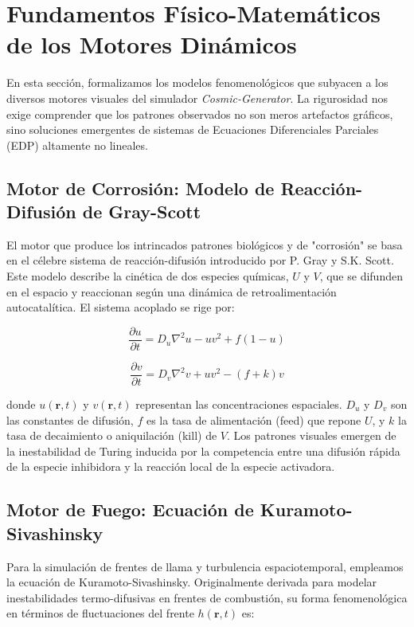 \documentclass[12pt]{article}
\begin{document}
\section{Fundamentos Físico-Matemáticos de los Motores Dinámicos}
\label{sec:fundamentos_motores}

En esta sección, formalizamos los modelos fenomenológicos que subyacen a los diversos motores visuales del simulador \textit{Cosmic-Generator}. La rigurosidad nos exige comprender que los patrones observados no son meros artefactos gráficos, sino soluciones emergentes de sistemas de Ecuaciones Diferenciales Parciales (EDP) altamente no lineales.

\subsection{Motor de Corrosión: Modelo de Reacción-Difusión de Gray-Scott}
El motor que produce los intrincados patrones biológicos y de "corrosión" se basa en el célebre sistema de reacción-difusión introducido por P. Gray y S.K. Scott. Este modelo describe la cinética de dos especies químicas, $U$ y $V$, que se difunden en el espacio y reaccionan según una dinámica de retroalimentación autocatalítica. El sistema acoplado se rige por:

\begin{equation}
\frac{\partial u}{\partial t} = D_u \nabla^2 u - u v^2 + f(1 - u)
\end{equation}

\begin{equation}
\frac{\partial v}{\partial t} = D_v \nabla^2 v + u v^2 - (f + k)v
\end{equation}

donde $u(\mathbf{r},t)$ y $v(\mathbf{r},t)$ representan las concentraciones espaciales. $D_u$ y $D_v$ son las constantes de difusión, $f$ es la tasa de alimentación (feed) que repone $U$, y $k$ la tasa de decaimiento o aniquilación (kill) de $V$. Los patrones visuales emergen de la inestabilidad de Turing inducida por la competencia entre una difusión rápida de la especie inhibidora y la reacción local de la especie activadora.

\subsection{Motor de Fuego: Ecuación de Kuramoto-Sivashinsky}
Para la simulación de frentes de llama y turbulencia espaciotemporal, empleamos la ecuación de Kuramoto-Sivashinsky. Originalmente derivada para modelar inestabilidades termo-difusivas en frentes de combustión, su forma fenomenológica en términos de fluctuaciones del frente $h(\mathbf{r},t)$ es:
\end{document}
